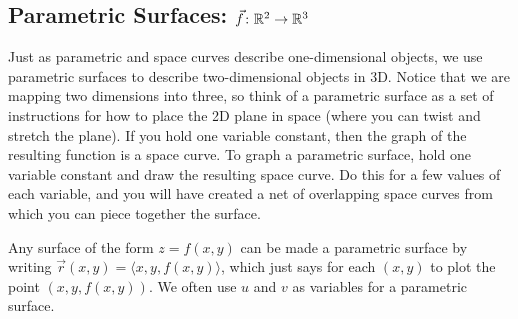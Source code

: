 \subsection{Parametric Surfaces: {$\vec f\colon {\ensuremath{\mathbb{R}}}^2\to {\ensuremath{\mathbb{R}}}^3$} }
\label{sec:param-surf-vec}

Just as parametric and space curves describe one-dimensional objects, we use parametric surfaces to describe two-dimensional objects in 3D.  Notice that we are mapping two dimensions into three, so think of a parametric surface as a set of instructions for how to place the 2D plane in space (where you can twist and stretch the plane).  If you hold one variable constant, then the graph of the resulting function is a space curve. To graph a parametric surface, hold one variable constant and draw the resulting space curve.  Do this for a few values of each variable, and you will have created a net of overlapping space curves from which you can piece together the surface.  

Any surface of the form $z=f(x,y)$ can be made a parametric surface by
writing $\vec r(x,y)=\langle x,y,f(x,y)\rangle$, which just says for
each $(x,y)$ to plot the point $(x,y,f(x,y))$. We often use $u$ and
$v$ as variables for a parametric surface.


